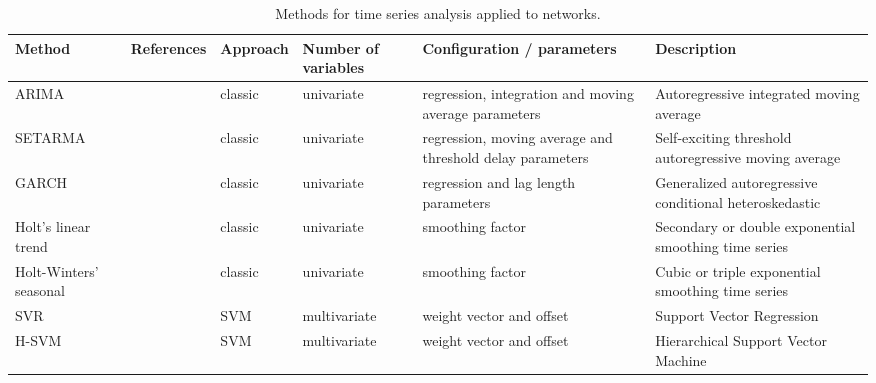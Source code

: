 \begin{table}[htp]
	\caption{Methods for time series analysis applied to networks.}
	\centering
	\label{tab:IEEECOMSTmodels}
	\def\arraystretch{1.2}%
	\setlength\tabcolsep{2.0pt} %
	{\scriptsize
		\begin{tabular}{>{\centering\arraybackslash}m{}
			>{\centering\arraybackslash}m{}
			>{\centering\arraybackslash}m{}
			>{\centering\arraybackslash}m{}
			>{\centering\arraybackslash}m{}
			>{\centering\arraybackslash}m{}
		}
		\toprule
		\textbf{Method} &  \textbf{References} & \textbf{Approach} & \textbf{Number of variables} & \textbf{Configuration / parameters} & \textbf{Description} \\
		\midrule
		\midrule
		ARIMA & \cite{calheiros2014, dong2015, amin2012, amin2012-2, Wang2017-2} & classic & univariate & regression, integration and moving average parameters & Autoregressive integrated moving average \\
		SETARMA & \cite{amin2012} & classic & univariate & regression, moving average and threshold delay parameters & Self-exciting threshold autoregressive moving average \\
		GARCH & \cite{amin2012} & classic & univariate & regression and lag length parameters & Generalized autoregressive conditional heteroskedastic \\
		Holt’s linear trend & \cite{dong2015} & classic & univariate & smoothing factor & Secondary or double exponential smoothing time series \\
		Holt-Winters’ seasonal & \cite{Szmit2012, Shahin2017} & classic & univariate & smoothing factor & Cubic or triple exponential smoothing time series \\
		SVR & \cite{Mirza2010, Bermolen2009} & SVM & multivariate & weight vector and offset & Support Vector Regression \\
		H-SVM & \cite{Feng2011} & SVM & multivariate & weight vector and offset & Hierarchical Support Vector Machine \\

\end{tabular}}
\end{table}
